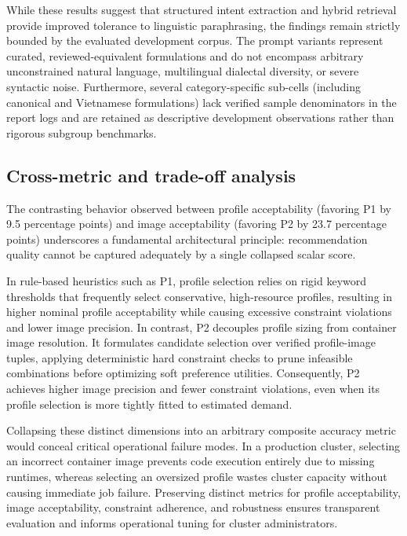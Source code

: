 While these results suggest that structured intent extraction and hybrid retrieval provide improved tolerance to linguistic paraphrasing, the findings remain strictly bounded by the evaluated development corpus. The prompt variants represent curated, reviewed-equivalent formulations and do not encompass arbitrary unconstrained natural language, multilingual dialectal diversity, or severe syntactic noise. Furthermore, several category-specific sub-cells (including canonical and Vietnamese formulations) lack verified sample denominators in the report logs and are retained as descriptive development observations rather than rigorous subgroup benchmarks.

\subsection{Cross-metric and trade-off analysis}
\label{subsec:cross_metric_analysis}

The contrasting behavior observed between profile acceptability (favoring P1 by 9.5 percentage points) and image acceptability (favoring P2 by 23.7 percentage points) underscores a fundamental architectural principle: recommendation quality cannot be captured adequately by a single collapsed scalar score.

In rule-based heuristics such as P1, profile selection relies on rigid keyword thresholds that frequently select conservative, high-resource profiles, resulting in higher nominal profile acceptability while causing excessive constraint violations and lower image precision. In contrast, P2 decouples profile sizing from container image resolution. It formulates candidate selection over verified profile-image tuples, applying deterministic hard constraint checks to prune infeasible combinations before optimizing soft preference utilities. Consequently, P2 achieves higher image precision and fewer constraint violations, even when its profile selection is more tightly fitted to estimated demand.

Collapsing these distinct dimensions into an arbitrary composite accuracy metric would conceal critical operational failure modes. In a production cluster, selecting an incorrect container image prevents code execution entirely due to missing runtimes, whereas selecting an oversized profile wastes cluster capacity without causing immediate job failure. Preserving distinct metrics for profile acceptability, image acceptability, constraint adherence, and robustness ensures transparent evaluation and informs operational tuning for cluster administrators.


